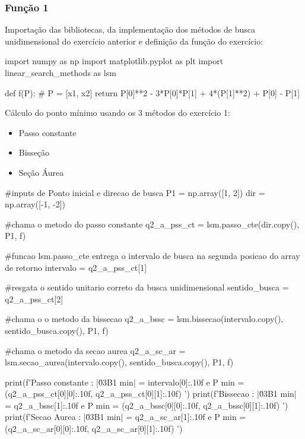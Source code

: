 \documentclass[10pt, a4paper]{article}
\begin{document}
\subsubsection{Função 1}

Importação das bibliotecas, da implementação dos métodos de busca unidimensional do exercício anterior e
definição da função do exercício:

\begin{python}
  import numpy as np
  import matplotlib.pyplot as plt
  import linear_search_methods as lsm

  def f(P):
    # P = [x1, x2]
    return P[0]**2 - 3*P[0]*P[1] + 4*(P[1]**2) + P[0] - P[1]
\end{python}

  Cálculo do ponto mínimo usando os 3 métodos do exercício 1:

\begin{itemize}
  \item Passo constante
  \item Bisseção
  \item Seção Áurea
\end{itemize}

\begin{python}

  #inputs de Ponto inicial e direcao de busca
  P1 = np.array([1, 2])
  dir = np.array([-1, -2])

  #chama o metodo do passo constante
  q2_a_pss_ct = lsm.passo_cte(dir.copy(), P1, f)

  #funcao lsm.passo_cte entrega o intervalo de busca na segunda posicao do array de retorno
  intervalo = q2_a_pss_ct[1]

  #resgata o sentido unitario correto da busca unidimensional
  sentido_busca = q2_a_pss_ct[2]

  #chama o o metodo da bissecao
  q2_a_bssc = lsm.bissecao(intervalo.copy(), sentido_busca.copy(), P1, f)

  #chama o metodo da secao aurea
  q2_a_sc_ar = lsm.secao_aurea(intervalo.copy(), sentido_busca.copy(), P1, f)

  print(f'Passo constante : |\u03B1 min| = {intervalo[0]:.10f} e P min = ({q2_a_pss_ct[0][0]:.10f}, {q2_a_pss_ct[0][1]:.10f}) ')
  print(f'Bissecao        : |\u03B1 min| = {q2_a_bssc[1]:.10f} e P min = ({q2_a_bssc[0][0]:.10f}, {q2_a_bssc[0][1]:.10f}) ')
  print(f'Secao Aurea     : |\u03B1 min| = {q2_a_sc_ar[1]:.10f} e P min = ({q2_a_sc_ar[0][0]:.10f}, {q2_a_sc_ar[0][1]:.10f}) ')

\end{python}
\end{document}
